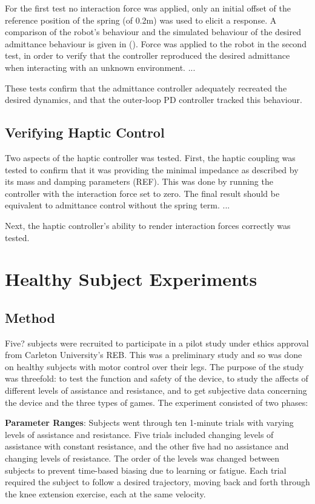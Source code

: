 \documentclass[12pt]{report}
\begin{document}
	For the first test no interaction force was applied, only an initial offset of the reference position of the spring (of 0.2m) was used to elicit a response. A comparison of the robot's behaviour and the simulated behaviour of the desired admittance behaviour is given in (). Force was applied to the robot in the second test, in order to verify that the controller reproduced the desired admittance when interacting with an unknown environment. ... 
	


	
	These tests confirm that the admittance controller adequately recreated the desired dynamics, and that the outer-loop PD controller tracked this behaviour. 
	
	\subsection{Verifying Haptic Control}
	
	Two aspects of the haptic controller was tested. First, the haptic coupling was tested to confirm that it was providing the minimal impedance as described by its mass and damping parameters (REF). This was done by running the controller with the interaction force set to zero. The final result should be equivalent to admittance control without the spring term. ...
	
	Next, the haptic controller's ability to render interaction forces correctly was tested. 
	
	\section{Healthy Subject Experiments}
	
	
	
		\subsection{Method}
		
		Five? subjects were recruited to participate in a pilot study under ethics approval from Carleton University's REB. This was a preliminary study and so was done on healthy subjects with motor control over their legs. The purpose of the study was threefold: to test the function and safety of the device, to study the affects of different levels of assistance and resistance, and to get subjective data concerning the device and the three types of games. The experiment consisted of two phases: 

\textbf{Parameter Ranges}: Subjects went through ten 1-minute trials with varying levels of assistance and resistance. Five trials included changing levels of assistance with constant resistance, and the other five had no assistance and changing levels of resistance. The order of the levels was changed between subjects to prevent time-based biasing due to learning or fatigue. Each trial required the subject to follow a desired trajectory, moving back and forth through the knee extension exercise, each at the same velocity. 
\end{document}
